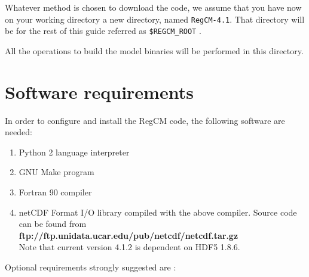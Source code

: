 %
%

Whatever method is chosen to download the code, we assume that you have now
on your working directory a new directory, named \verb=RegCM-4.1=.
That directory will be for the rest of this guide referred as 
\verb=$REGCM_ROOT= .

All the operations to build the model binaries will be performed in this
directory.

\section{Software requirements}

In order to configure and install the RegCM code, the following software are
needed:

\begin{enumerate}
\item Python 2 language interpreter
\item GNU Make program
\item Fortran 90 compiler
\item netCDF Format I/O library compiled with the above compiler.
   Source code can be found from \\
{\bf ftp://ftp.unidata.ucar.edu/pub/netcdf/netcdf.tar.gz} \\
Note that current version 4.1.2 is dependent on HDF5 1.8.6.
\end{enumerate}

Optional requirements strongly suggested are :

